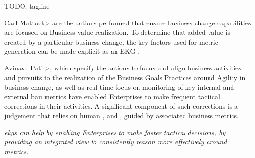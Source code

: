 TODO: tagline

Carl Mattock>\textbf{} are the actions performed that ensure
business change capabilities are focused on Business value realization.
To determine that added value is created by a particular business change, the key factors used for metric generation
can be made explicit as an EKG .

Avinash Patil>\textbf{}, which specify the actions to focus and align
business activities and pursuits to the realization of the Business Goals Practices around Agility in
business change, as well as real-time focus on monitoring of key internal and external \gls{bau} metrics have enabled
Enterprises to make frequent tactical corrections in their activities.
A significant component of such corrections is a judgement that relies on human , 
and , guided by associated business metrics.

\textit{\Glspl{ekg} can help by enabling Enterprises to make faster tactical decisions, by providing an integrated view to
consistently reason more effectively around metrics.}
